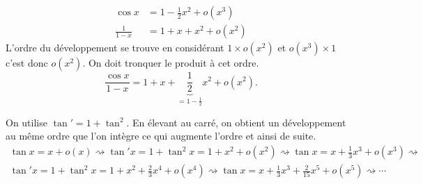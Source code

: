 \begin{exple}
\begin{align*}
 \cos x        &= 1 - \frac{1}{2}x^2 + o(x^3) \\
 \frac{1}{1 - x} &= 1 + x + x^2 + o(x^2)
\end{align*}
L'ordre du développement se trouve en considérant $1 \times o(x^2)$ et $o(x^3) \times 1$ c'est donc $o(x^2)$. On doit tronquer le produit à cet ordre.
\[
 \frac{\cos x}{1 - x} = 1 + x + \underset{= 1 - \frac{1}{2}}{\underbrace{\frac{1}{2}}}x^2 + o(x^2).
\]  
\end{exple}

\begin{exple}
 On utilise $\tan'=1+\tan^2$. En élevant au carré, on obtient un développement au même ordre que l'on intègre ce qui augmente l'ordre et ainsi de suite.
\begin{multline*}
 \tan x = x+o(x)\rightsquigarrow \tan'x = 1+\tan^2 x = 1+x^2 +o(x^2)\rightsquigarrow
 \tan x = x+\frac{1}{3}x^3 +o(x^3)\rightsquigarrow \\
\tan'x = 1+\tan^2 x = 1+x^2 +\frac{2}{3}x^4+o(x^4)\rightsquigarrow
\tan x = x+\frac{1}{3}x^3 +\frac{2}{15}x^5 +o(x^5)\rightsquigarrow \cdots
\end{multline*}
\end{exple}


